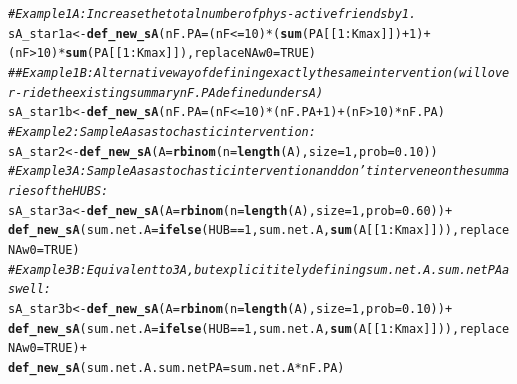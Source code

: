 \documentclass[english]{article}\usepackage[]{graphicx}\usepackage[]{color}
\makeatletter
\newcommand{\hlnum}[1]{\textcolor[rgb]{0.686,0.059,0.569}{#1}}%
\newcommand{\hlcom}[1]{\textcolor[rgb]{0.678,0.584,0.686}{\textit{#1}}}%
\newcommand{\hlopt}[1]{\textcolor[rgb]{0,0,0}{#1}}%
\newcommand{\hlstd}[1]{\textcolor[rgb]{0.345,0.345,0.345}{#1}}%
\newcommand{\hlkwb}[1]{\textcolor[rgb]{0.69,0.353,0.396}{#1}}%
\newcommand{\hlkwc}[1]{\textcolor[rgb]{0.333,0.667,0.333}{#1}}%
\newcommand{\hlkwd}[1]{\textcolor[rgb]{0.737,0.353,0.396}{\textbf{#1}}}%
\newenvironment{kframe}{%
 \def\at@end@of@kframe{}%
 \ifinner\ifhmode%
  \def\at@end@of@kframe{\end{minipage}}%
  \begin{minipage}{\columnwidth}%
 \fi\fi%
 \def\FrameCommand##1{\hskip\@totalleftmargin \hskip-\fboxsep
 \colorbox{shadecolor}{##1}\hskip-\fboxsep
     \hskip-\linewidth \hskip-\@totalleftmargin \hskip\columnwidth}%
 \MakeFramed {\advance\hsize-\width
   \@totalleftmargin\z@ \linewidth\hsize
   \@setminipage}}%
 {\par\unskip\endMakeFramed%
 \at@end@of@kframe}
\newenvironment{knitrout}{}{} %
\theoremstyle{plain}
\theoremstyle{plain}
\makeatother
\begin{document}
\begin{knitrout}\footnotesize
{}\color{fgcolor}\begin{kframe}
\begin{alltt}
\hlcom{# Example 1A: Increase the total number of phys-active friends by 1.}
\hlstd{sA_star1a} \hlkwb{<-} \hlkwd{def_new_sA}\hlstd{(}\hlkwc{nF.PA} \hlstd{= (nF} \hlopt{<=} \hlnum{10}\hlstd{)}\hlopt{*}\hlstd{(}\hlkwd{sum}\hlstd{(PA[[}\hlnum{1}\hlopt{:}\hlstd{Kmax]])}\hlopt{+}\hlnum{1}\hlstd{)} \hlopt{+} \hlstd{(nF} \hlopt{>} \hlnum{10}\hlstd{)}\hlopt{*}\hlkwd{sum}\hlstd{(PA[[}\hlnum{1}\hlopt{:}\hlstd{Kmax]]),} \hlkwc{replaceNAw0} \hlstd{=} \hlnum{TRUE}\hlstd{)}
\hlcom{# # Example 1B: Alternative way of defining exactly the same intervention (will over-ride the existing summary nF.PA defined under sA)}
\hlstd{sA_star1b} \hlkwb{<-} \hlkwd{def_new_sA}\hlstd{(}\hlkwc{nF.PA} \hlstd{= (nF} \hlopt{<=} \hlnum{10}\hlstd{)}\hlopt{*}\hlstd{(nF.PA}\hlopt{+}\hlnum{1}\hlstd{)} \hlopt{+} \hlstd{(nF} \hlopt{>} \hlnum{10}\hlstd{)}\hlopt{*}\hlstd{nF.PA)}
\hlcom{# Example 2: Sample A as a stochastic intervention:}
\hlstd{sA_star2} \hlkwb{<-}  \hlkwd{def_new_sA}\hlstd{(}\hlkwc{A} \hlstd{=} \hlkwd{rbinom}\hlstd{(}\hlkwc{n} \hlstd{=} \hlkwd{length}\hlstd{(A),} \hlkwc{size} \hlstd{=} \hlnum{1}\hlstd{,} \hlkwc{prob} \hlstd{=} \hlnum{0.10}\hlstd{))}
\hlcom{# Example 3A: Sample A as a stochastic intervention and don't intervene on the summaries of the HUBS:}
\hlstd{sA_star3a} \hlkwb{<-} \hlkwd{def_new_sA}\hlstd{(}\hlkwc{A} \hlstd{=} \hlkwd{rbinom}\hlstd{(}\hlkwc{n} \hlstd{=} \hlkwd{length}\hlstd{(A),} \hlkwc{size} \hlstd{=} \hlnum{1}\hlstd{,} \hlkwc{prob} \hlstd{=} \hlnum{0.60}\hlstd{))} \hlopt{+}
  \hlkwd{def_new_sA}\hlstd{(}\hlkwc{sum.net.A} \hlstd{=} \hlkwd{ifelse}\hlstd{(HUB}\hlopt{==}\hlnum{1}\hlstd{, sum.net.A,} \hlkwd{sum}\hlstd{(A[[}\hlnum{1}\hlopt{:}\hlstd{Kmax]])),} \hlkwc{replaceNAw0} \hlstd{=} \hlnum{TRUE}\hlstd{)}
\hlcom{# Example 3B: Equivalent to 3A, but explicititely defining sum.net.A.sum.netPA as well:}
\hlstd{sA_star3b} \hlkwb{<-} \hlkwd{def_new_sA}\hlstd{(}\hlkwc{A} \hlstd{=} \hlkwd{rbinom}\hlstd{(}\hlkwc{n} \hlstd{=} \hlkwd{length}\hlstd{(A),} \hlkwc{size} \hlstd{=} \hlnum{1}\hlstd{,} \hlkwc{prob} \hlstd{=} \hlnum{0.10}\hlstd{))} \hlopt{+}
  \hlkwd{def_new_sA}\hlstd{(}\hlkwc{sum.net.A} \hlstd{=} \hlkwd{ifelse}\hlstd{(HUB}\hlopt{==}\hlnum{1}\hlstd{, sum.net.A,} \hlkwd{sum}\hlstd{(A[[}\hlnum{1}\hlopt{:}\hlstd{Kmax]])),} \hlkwc{replaceNAw0} \hlstd{=} \hlnum{TRUE}\hlstd{)} \hlopt{+}
  \hlkwd{def_new_sA}\hlstd{(}\hlkwc{sum.net.A.sum.netPA} \hlstd{= sum.net.A}\hlopt{*}\hlstd{nF.PA)}
\end{alltt}
\end{kframe}
\end{knitrout}
\end{document}

